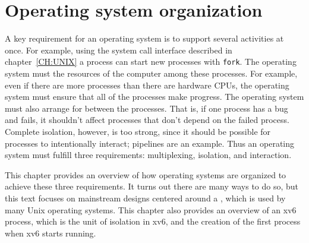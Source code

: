 
\chapter{Operating system organization}
\label{CH:FIRST}

A key requirement for an operating system is to support several activities at once.  For
example, using the system call interface described in
chapter~\ref{CH:UNIX}
a process can start new processes with 
\lstinline{fork}.
The operating system must 
the resources of the computer among these processes.
For example, even if there are more processes
than there are hardware CPUs, the operating
system must ensure that all of the processes
make progress.  The operating system must also arrange for
between the processes.
That is, if one process has a bug and fails, it shouldn't affect processes that
don't depend on the failed process.
Complete isolation, however, is too strong, since it should be possible for
processes to intentionally interact; pipelines are an example.
Thus
an operating system must fulfill three requirements: multiplexing, isolation,
and interaction.

This chapter provides an overview of how operating systems are
organized to achieve these three requirements.  It turns out there are
many ways to do so, but this text focuses on mainstream designs
centered around a , which is used by many
Unix operating systems.  This chapter also provides an overview of an
xv6 process, which is the unit of isolation in xv6, and the
creation of the first process when xv6 starts running.

